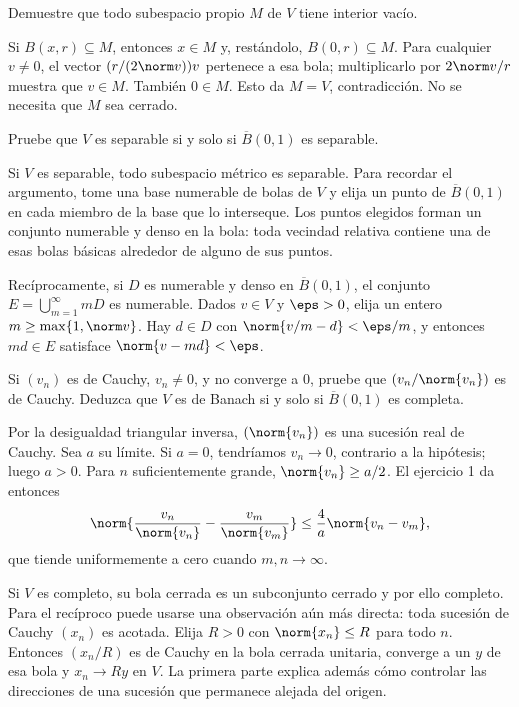 \begin{ejercicio}
Demuestre que todo subespacio propio $M$ de $V$ tiene interior vacío.
\end{ejercicio}
\begin{solucion}
Si $B(x,r)\subseteq M$, entonces $x\in M$ y, restándolo, $B(0,r)\subseteq M$. Para cualquier $v\ne0$, el vector $(r/(2\norm v))v$ pertenece a esa bola; multiplicarlo por $2\norm v/r$ muestra que $v\in M$. También $0\in M$. Esto da $M=V$, contradicción. No se necesita que $M$ sea cerrado.
\end{solucion}

\begin{ejercicio}
Pruebe que $V$ es separable si y solo si $\overline B(0,1)$ es separable.
\end{ejercicio}
\begin{solucion}
Si $V$ es separable, todo subespacio métrico es separable. Para recordar el argumento, tome una base numerable de bolas de $V$ y elija un punto de $\overline B(0,1)$ en cada miembro de la base que lo interseque. Los puntos elegidos forman un conjunto numerable y denso en la bola: toda vecindad relativa contiene una de esas bolas básicas alrededor de alguno de sus puntos.

Recíprocamente, si $D$ es numerable y denso en $\overline B(0,1)$, el conjunto $E=\bigcup_{m=1}^{\infty}mD$ es numerable. Dados $v\in V$ y $\eps>0$, elija un entero $m\geq\max\{1,\norm v\}$. Hay $d\in D$ con $\norm{v/m-d}<\eps/m$, y entonces $md\in E$ satisface $\norm{v-md}<\eps$.
\end{solucion}

\begin{ejercicio}
Si $(v_n)$ es de Cauchy, $v_n\ne0$, y no converge a $0$, pruebe que $(v_n/\norm{v_n})$ es de Cauchy. Deduzca que $V$ es de Banach si y solo si $\overline B(0,1)$ es completa.
\end{ejercicio}
\begin{solucion}
Por la desigualdad triangular inversa, $(\norm{v_n})$ es una sucesión real de Cauchy. Sea $a$ su límite. Si $a=0$, tendríamos $v_n\to0$, contrario a la hipótesis; luego $a>0$. Para $n$ suficientemente grande, $\norm{v_n}\geq a/2$. El ejercicio 1 da entonces
\[
 \norm{\frac{v_n}{\norm{v_n}}-\frac{v_m}{\norm{v_m}}}\leq\frac4a\norm{v_n-v_m},
\]
que tiende uniformemente a cero cuando $m,n\to\infty$.

Si $V$ es completo, su bola cerrada es un subconjunto cerrado y por ello completo. Para el recíproco puede usarse una observación aún más directa: toda sucesión de Cauchy $(x_n)$ es acotada. Elija $R>0$ con $\norm{x_n}\leq R$ para todo $n$. Entonces $(x_n/R)$ es de Cauchy en la bola cerrada unitaria, converge a un $y$ de esa bola y $x_n\to Ry$ en $V$. La primera parte explica además cómo controlar las direcciones de una sucesión que permanece alejada del origen.
\end{solucion}

